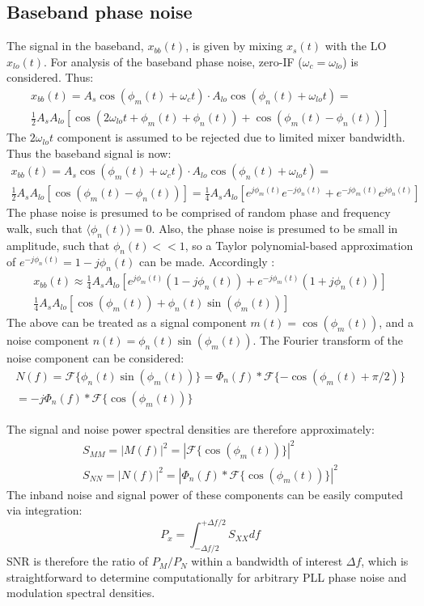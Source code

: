 \documentclass[10pt,a4paper]{article}
\begin{document}
	\subsection{Baseband phase noise}
	The signal in the baseband, $x_{bb}(t)$, is given by mixing $x_{s}(t)$ with the LO $x_{lo}(t)$. For analysis of the baseband phase noise, zero-IF ($\omega_{c}=\omega_{lo}$) is considered. Thus:
	\begin{align}
	x_{bb}(t) = A_s\cos(\phi_m(t)+\omega_ct)\cdot A_{lo}\cos(\phi_n(t)+\omega_{lo}t) = \\
	\frac{1}{2}A_sA_{lo}\left[\cos(2\omega_{lo}t + \phi_m(t) + \phi_n(t)) +  \cos(\phi_m(t) - \phi_n(t))\right] 
	\end{align} 
	The $2\omega_{lo}t$ component is assumed to be rejected due to limited mixer bandwidth. Thus the baseband signal is now:
	\begin{align}
	x_{bb}(t) = A_s\cos(\phi_m(t)+\omega_ct)\cdot A_{lo}\cos(\phi_n(t)+\omega_{lo}t) = \\
	\frac{1}{2}A_sA_{lo}\left[\cos(\phi_m(t) - \phi_n(t))\right] = \frac{1}{4}A_sA_{lo}\left[e^{j\phi_m(t)} e^{-j\phi_n(t)} + e^{-j\phi_m(t)} e^{j\phi_n(t)}\right] 
	\end{align} 
	The phase noise is presumed to be comprised of random phase and frequency walk, such that $\langle\phi_n(t)\rangle = 0$. Also, the phase noise is presumed to be small in amplitude, such that $\phi_n(t) << 1$, so a Taylor polynomial-based approximation of $e^{-j\phi_n(t)} = 1 -j\phi_n(t)$ can be made. Accordingly :
	\begin{align}
	x_{bb}(t) \approx \frac{1}{4}A_sA_{lo}\left[e^{j\phi_m(t)}(1 -j\phi_n(t))+ e^{-j\phi_m(t)}(1+j\phi_n(t))\right] \\
	\frac{1}{4}A_sA_{lo}\left[\cos(\phi_m(t)) + \phi_n(t)\sin(\phi_m(t))\right]
	\end{align} 
	The above can be treated as a signal component $m(t) = \cos(\phi_m(t))$, and a noise component $n(t) = \phi_n(t)\sin(\phi_m(t))$. The Fourier transform of the noise component can be considered:
	\begin{align}
	N(f) = \mathcal{F}\{\phi_n(t)\sin(\phi_m(t))\} = \Phi_n(f)*\mathcal{F}\{-\cos(\phi_m(t)+\pi/2)\}\\
	=-j\Phi_n(f)*\mathcal{F}\{\cos(\phi_m(t))\}
	\end{align}

	The signal and noise power spectral densities are therefore approximately:
		\begin{align}
	S_{MM} = |M(f)|^2 = |\mathcal{F}\{\cos(\phi_m(t))\}|^2\\
	S_{NN} = |N(f)|^2 = |\Phi_n(f)*\mathcal{F}\{\cos(\phi_m(t))\}|^2
	\end{align}
	The inband noise and signal power of these components can be easily computed via integration:
	\begin{equation}
	P_x = \int^{+\Delta f/2}_{-\Delta f/2}S_{XX}df
	\end{equation}
	SNR is therefore the ratio of $P_M/P_N$ within a bandwidth of interest $\Delta f$, which is straightforward to determine computationally for arbitrary PLL phase noise and modulation spectral densities.
	\FloatBarrier
	\flushleft
\end{document}
